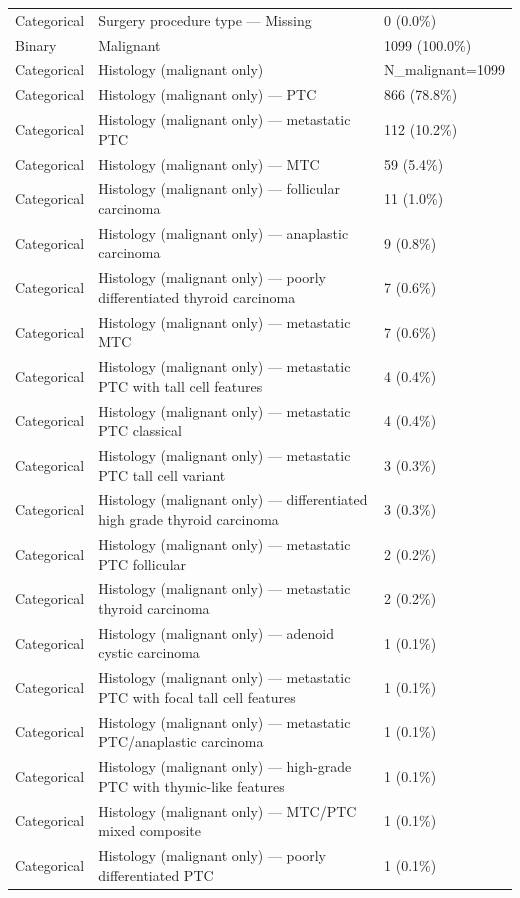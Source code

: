 \begin{table}[htbp]
\begin{tabular}{lll}
Categorical & Surgery procedure type — Missing & 0 (0.0\%) \\
Binary & Malignant & 1099 (100.0\%) \\
Categorical & Histology (malignant only) & N\_malignant=1099 \\
Categorical & Histology (malignant only) — PTC & 866 (78.8\%) \\
Categorical & Histology (malignant only) — metastatic PTC & 112 (10.2\%) \\
Categorical & Histology (malignant only) — MTC & 59 (5.4\%) \\
Categorical & Histology (malignant only) — follicular carcinoma & 11 (1.0\%) \\
Categorical & Histology (malignant only) — anaplastic carcinoma & 9 (0.8\%) \\
Categorical & Histology (malignant only) — poorly differentiated thyroid carcinoma & 7 (0.6\%) \\
Categorical & Histology (malignant only) — metastatic MTC & 7 (0.6\%) \\
Categorical & Histology (malignant only) — metastatic PTC with tall cell features & 4 (0.4\%) \\
Categorical & Histology (malignant only) — metastatic PTC classical & 4 (0.4\%) \\
Categorical & Histology (malignant only) — metastatic PTC tall cell variant & 3 (0.3\%) \\
Categorical & Histology (malignant only) — differentiated high grade thyroid carcinoma & 3 (0.3\%) \\
Categorical & Histology (malignant only) — metastatic PTC follicular & 2 (0.2\%) \\
Categorical & Histology (malignant only) — metastatic thyroid carcinoma & 2 (0.2\%) \\
Categorical & Histology (malignant only) — adenoid cystic carcinoma & 1 (0.1\%) \\
Categorical & Histology (malignant only) — metastatic PTC with focal tall cell features & 1 (0.1\%) \\
Categorical & Histology (malignant only) — metastatic PTC/anaplastic carcinoma & 1 (0.1\%) \\
Categorical & Histology (malignant only) — high-grade PTC with thymic-like features & 1 (0.1\%) \\
Categorical & Histology (malignant only) — MTC/PTC mixed composite & 1 (0.1\%) \\
Categorical & Histology (malignant only) — poorly differentiated PTC & 1 (0.1\%) \\

\end{tabular}
\end{table}
